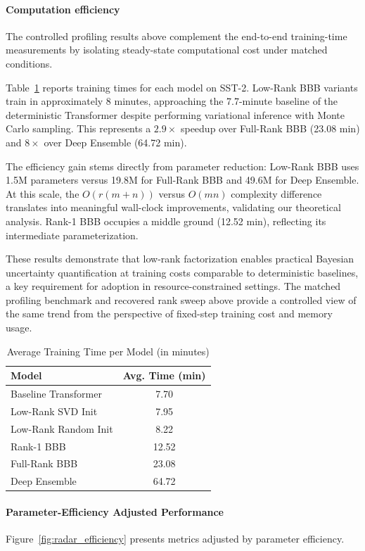 \documentclass{article}
\theoremstyle{plain}
\theoremstyle{definition}
\theoremstyle{remark}
\begin{document}
\paragraph{Computation efficiency}
The controlled profiling results above complement the end-to-end training-time measurements by isolating steady-state computational cost under matched conditions.

Table~\ref{tab:training_times} reports training times for each model on SST-2. Low-Rank BBB variants train in approximately 8 minutes, approaching the 7.7-minute baseline of the deterministic Transformer despite performing variational inference with Monte Carlo sampling. This represents a $2.9\times$ speedup over Full-Rank BBB (23.08 min) and $8\times$ over Deep Ensemble (64.72 min). 

The efficiency gain stems directly from parameter reduction: Low-Rank BBB uses 1.5M parameters versus 19.8M for Full-Rank BBB and 49.6M for Deep Ensemble. At this scale, the $O(r(m+n))$ versus $O(mn)$ complexity difference translates into meaningful wall-clock improvements, validating our theoretical analysis. Rank-1 BBB occupies a middle ground (12.52 min), reflecting its intermediate parameterization.

These results demonstrate that low-rank factorization enables practical Bayesian uncertainty quantification at training costs comparable to deterministic baselines, a key requirement for adoption in resource-constrained settings. The matched profiling benchmark and recovered rank sweep above provide a controlled view of the same trend from the perspective of fixed-step training cost and memory usage.
\begin{table}[h]
\centering
\caption{Average Training Time per Model (in minutes)}
\label{tab:training_times}
\begin{tabular}{lc}
\toprule
\textbf{Model} & \textbf{Avg. Time (min)} \\
\midrule
Baseline Transformer & 7.70 \\
Low-Rank SVD Init & 7.95 \\
Low-Rank Random Init & 8.22 \\
Rank-1 BBB & 12.52 \\
Full-Rank BBB & 23.08 \\
Deep Ensemble & 64.72 \\
\bottomrule
\end{tabular}
\end{table}
\paragraph{Parameter-Efficiency Adjusted Performance}
Figure~\ref{fig:radar_efficiency} presents metrics adjusted by parameter efficiency. 
\end{document}
